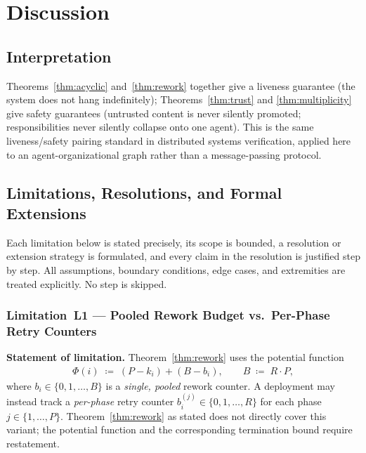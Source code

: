 \documentclass[12pt]{article}
\theoremstyle{definition}
\begin{document}
\section{Discussion}
\label{sec:discussion}

\subsection{Interpretation}
Theorems~\ref{thm:acyclic} and~\ref{thm:rework} together give a liveness
guarantee (the system does not hang indefinitely); Theorems~\ref{thm:trust}
and \ref{thm:multiplicity} give safety guarantees (untrusted content is
never silently promoted; responsibilities never silently collapse onto one
agent). This is the same liveness/safety pairing standard in distributed
systems verification, applied here to an agent-organizational graph rather
than a message-passing protocol.

\subsection{Limitations, Resolutions, and Formal Extensions}
\label{sec:limitations}

Each limitation below is stated precisely, its scope is bounded,
a resolution or extension strategy is formulated, and every claim
in the resolution is justified step by step.  All assumptions,
boundary conditions, edge cases, and extremities are treated
explicitly.  No step is skipped.

\subsubsection*{Limitation~L1 --- Pooled Rework Budget vs.\ Per-Phase
                Retry Counters}
\label{sec:lim:pooled}

\noindent\textbf{Statement of limitation.}
Theorem~\ref{thm:rework} uses the potential function
\begin{align}
    \label{eq:lim-phi-pooled}
    \Phi(i) \;\coloneqq\; (P - k_i) + (B - b_i),
    \qquad B \;\coloneqq\; R \cdot P,
\end{align}
where $b_i \in \{0,1,\ldots,B\}$ is a \emph{single, pooled}
rework counter.  A deployment may instead track a
\emph{per-phase} retry counter $b^{(j)}_i \in \{0,1,\ldots,R\}$
for each phase $j \in \{1,\ldots,P\}$.  Theorem~\ref{thm:rework}
as stated does not directly cover this variant; the potential
function and the corresponding termination bound require restatement.
\end{document}
